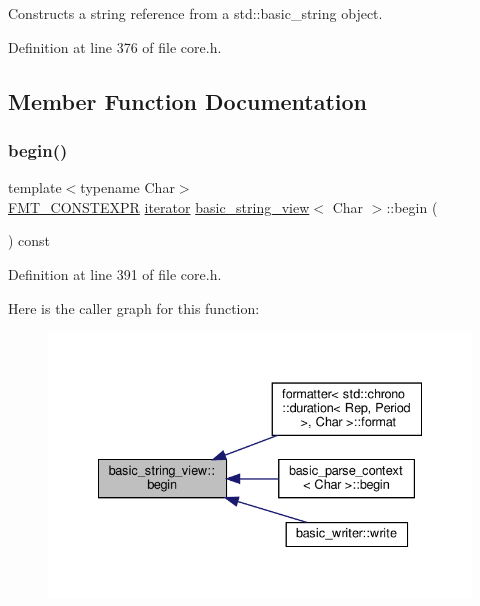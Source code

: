 Constructs a string reference from a {\ttfamily std\+::basic\+\_\+string} object. 

Definition at line 376 of file core.\+h.



\subsection{Member Function Documentation}
\mbox{\label{classbasic__string__view_a3433da1f079eb7874d97f32245bb08fa}} 
\subsubsection{\texorpdfstring{begin()}{begin()}}
{\footnotesize\ttfamily template$<$typename Char$>$ \\
\hyperlink{core_8h_a69201cb276383873487bf68b4ef8b4cd}{F\+M\+T\+\_\+\+C\+O\+N\+S\+T\+E\+X\+PR} \hyperlink{classbasic__string__view_aac52df0e56cb4b197372306e0da039e0}{iterator} \hyperlink{classbasic__string__view}{basic\+\_\+string\+\_\+view}$<$ Char $>$\+::begin (\begin{DoxyParamCaption}{ }\end{DoxyParamCaption}) const\hspace{0.3cm}{\ttfamily [inline]}}



Definition at line 391 of file core.\+h.

Here is the caller graph for this function\+:
\nopagebreak
\begin{figure}[H]
\begin{center}
\leavevmode
\includegraphics[width=335pt]{classbasic__string__view_a3433da1f079eb7874d97f32245bb08fa_icgraph}
\end{center}
\end{figure}
\mbox{\label{classbasic__string__view_af3f5cdfe71a7ada3227d5702ea456128}} 
